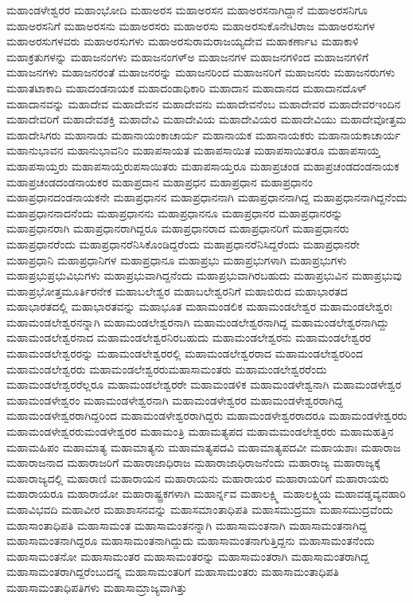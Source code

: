 {ಮಹಾಂಡಳೇಶ್ವರರ
ಮಹಾಂಭೋದಿ
ಮಹಾಅರಸ
ಮಹಾಅರಸನ
ಮಹಾಅರಸನಾಗಿದ್ದಾನೆ
ಮಹಾಅರಸನಿಗೂ
ಮಹಾಅರಸನಿಗೆ
ಮಹಾಅರಸನು
ಮಹಾಅರಸರು
ಮಹಾಅರಸು
ಮಹಾಅರಸುಕೊನೇಟಿರಾಜ
ಮಹಾಅರಸುಗಳ
ಮಹಾಅರಸುಗಳವರು
ಮಹಾಅರಸುಗಳು
ಮಹಾಅರಸುರಾಮರಾಜಯ್ಯದೇವ
ಮಹಾಕರ್ಣಾಟ
ಮಹಾಕಾಳಿ
ಮಹಾಕ್ರತುಗಳನ್ನು
ಮಹಾಜನಂಗಳು
ಮಹಾಜನಂಗಳ್ಅ
ಮಹಾಜನಗಳ
ಮಹಾಜನಗಳಿಂದ
ಮಹಾಜನಗಳಿಗೆ
ಮಹಾಜನಗಳು
ಮಹಾಜನರಂತೆ
ಮಹಾಜನರನ್ನು
ಮಹಾಜನರಿಂದ
ಮಹಾಜನರಿಗೆ
ಮಹಾಜನರು
ಮಹಾಜನರುಗಳು
ಮಹಾತಟಾಕಾದಿ
ಮಹಾದಂಡನಾಯಕ
ಮಹಾದಂಡಾಧಿಕಾರಿ
ಮಹಾದಾನ
ಮಹಾದಾನದ
ಮಹಾದಾನದೊಳ್
ಮಹಾದಾನವನ್ನು
ಮಹಾದೇವ
ಮಹಾದೇವನ
ಮಹಾದೇವನು
ಮಹಾದೇವನೆಂಬ
ಮಹಾದೇವರ
ಮಹಾದೇವರಇಂದಿನ
ಮಹಾದೇವರಿಗೆ
ಮಹಾದೇವಶಕ್ತಿ
ಮಹಾದೇವಿ
ಮಹಾದೇವಿಯ
ಮಹಾದೇವಿಯರ
ಮಹಾದೇವಿಯು
ಮಹಾದೇವೋತ್ತಮ
ಮಹಾದೇಸಿಗರು
ಮಹಾನಾಡು
ಮಹಾನಾಯಂಕಾಚಾರ್ಯ
ಮಹಾನಾಯಕ
ಮಹಾನಾಯಕರು
ಮಹಾನಾಯಕಾಚಾರ್ಯ
ಮಹಾನುಭಾವನ
ಮಹಾನುಭಾವನಿಂ
ಮಹಾಪಸಾಯತ
ಮಹಾಪಸಾಯಿತ
ಮಹಾಪಸಾಯಿತರೂ
ಮಹಾಪಸಾಯ್ತ
ಮಹಾಪಸಾಯ್ತರು
ಮಹಾಪಸಾಯ್ತರುಪಸಾಯಿತರು
ಮಹಾಪಸಾಯ್ತರೂ
ಮಹಾಪ್ರಚಂಡ
ಮಹಾಪ್ರಚಂಡದಂಡನಾಯಕ
ಮಹಾಪ್ರಚಂಡದಂಡನಾಯಕರ
ಮಹಾಪ್ರದಾನ
ಮಹಾಪ್ರಧನ
ಮಹಾಪ್ರಧಾನ
ಮಹಾಪ್ರಧಾನಂ
ಮಹಾಪ್ರಧಾನದಂಡನಾಯಕನೇ
ಮಹಾಪ್ರಧಾನನ
ಮಹಾಪ್ರಧಾನನಾಗಿ
ಮಹಾಪ್ರಧಾನನಾಗಿದ್ದ
ಮಹಾಪ್ರಧಾನನಾಗಿದ್ದನೆಂದು
ಮಹಾಪ್ರಧಾನನಾದನೆಂದು
ಮಹಾಪ್ರಧಾನನು
ಮಹಾಪ್ರಧಾನನೂ
ಮಹಾಪ್ರಧಾನರ
ಮಹಾಪ್ರಧಾನರನ್ನು
ಮಹಾಪ್ರಧಾನರಾಗಿ
ಮಹಾಪ್ರಧಾನರಾಗಿದ್ದರೂ
ಮಹಾಪ್ರಧಾನರಾದ
ಮಹಾಪ್ರಧಾನರಿಗೆ
ಮಹಾಪ್ರಧಾನರು
ಮಹಾಪ್ರಧಾನರೆಂದು
ಮಹಾಪ್ರಧಾನರೆನಿಸಿಕೊಂಡಿದ್ದರೆಂದು
ಮಹಾಪ್ರಧಾನರೆನಿಸಿದ್ದರೆಂದು
ಮಹಾಪ್ರಧಾನರೇ
ಮಹಾಪ್ರಧಾನಿ
ಮಹಾಪ್ರಧಾನಿಗಳ
ಮಹಾಪ್ರಧಾನೂ
ಮಹಾಪ್ರಭು
ಮಹಾಪ್ರಭುಗಳಾಗಿ
ಮಹಾಪ್ರಭುಗಳು
ಮಹಾಪ್ರಭುಪ್ರಭುವಿಭುಗಳು
ಮಹಾಪ್ರಭುವಾಗಿದ್ದನೆಂದು
ಮಹಾಪ್ರಭುವಾಗಿರಬಹುದು
ಮಹಾಪ್ರಭುವಿನ
ಮಹಾಪ್ರಭುವು
ಮಹಾಪ್ರಭೋತ್ತಮೂರ್ತಿರನೇಕ
ಮಹಾಬಲೇಶ್ವರ
ಮಹಾಬಲೇಶ್ವರನಿಗೆ
ಮಹಾಬಿರುದ
ಮಹಾಭಾರತದ
ಮಹಾಭಾರತದಲ್ಲಿ
ಮಹಾಭಾರತವನ್ನು
ಮಹಾಭೂತ
ಮಹಾಮಂಡಲಿಕ
ಮಹಾಮಂಡಲೇಶ್ವರ
ಮಹಾಮಂಡಲೇಶ್ವರಃ
ಮಹಾಮಂಡಲೇಶ್ವರನನ್ನಾಗಿ
ಮಹಾಮಂಡಲೇಶ್ವರನಾಗಿ
ಮಹಾಮಂಡಲೇಶ್ವರನಾಗಿದ್ದ
ಮಹಾಮಂಡಲೇಶ್ವರನಾಗಿದ್ದು
ಮಹಾಮಂಡಲೇಶ್ವರನಾದ
ಮಹಾಮಂಡಲೇಶ್ವರನಿರಬಹುದು
ಮಹಾಮಂಡಲೇಶ್ವರನು
ಮಹಾಮಂಡಲೇಶ್ವರರ
ಮಹಾಮಂಡಲೇಶ್ವರರನ್ನು
ಮಹಾಮಂಡಲೇಶ್ವರರಲ್ಲಿ
ಮಹಾಮಂಡಲೇಶ್ವರರಾದ
ಮಹಾಮಂಡಲೇಶ್ವರರಿಂದ
ಮಹಾಮಂಡಲೇಶ್ವರರು
ಮಹಾಮಂಡಲೇಶ್ವರರುಮಹಾಸಾಮಂತರು
ಮಹಾಮಂಡಲೇಶ್ವರರೆಂದು
ಮಹಾಮಂಡಲೇಶ್ವರರೆಲ್ಲರೂ
ಮಹಾಮಂಡಲೇಶ್ವರರೇ
ಮಹಾಮಂಡಳಿಕ
ಮಹಾಮಂಡಳೇಶ್ವನಾಗಿ
ಮಹಾಮಂಡಳೇಶ್ವರ
ಮಹಾಮಂಡಳೇಶ್ವರಂ
ಮಹಾಮಂಡಳೇಶ್ವರನಾಗಿ
ಮಹಾಮಂಡಳೇಶ್ವರರ
ಮಹಾಮಂಡಳೇಶ್ವರರಾಗಿದ್ದ
ಮಹಾಮಂಡಳೇಶ್ವರರಾಗಿದ್ದರಿಂದ
ಮಹಾಮಂಡಳೇಶ್ವರರಾಗಿದ್ದರು
ಮಹಾಮಂಡಳೇಶ್ವರರಾದರೂ
ಮಹಾಮಂಡಳೇಶ್ವರರು
ಮಹಾಮಂಡಳೇಶ್ವರರುಮಂಡಳೇಶ್ವರರ
ಮಹಾಮಂತ್ರಿ
ಮಹಾಮತ್ಯಪದ
ಮಹಾಮಮಂಡಲೇಶ್ವರರು
ಮಹಾಮಹತ್ತಿನ
ಮಹಾಮಹಿಪಂ
ಮಹಾಮಾತ್ಯ
ಮಹಾಮಾತ್ಯನು
ಮಹಾಮಾತ್ಯಪದವಿ
ಮಹಾಮಾತ್ಯಪದವೀ
ಮಹಾಯಶಾಃ
ಮಹಾರಾಜ
ಮಹಾರಾಜನಾದ
ಮಹಾರಾಜರಿಗೆ
ಮಹಾರಾಜಾಧಿರಾಜ
ಮಹಾರಾಜಾಧಿರಾಜನೆಂದು
ಮಹಾರಾಜ್ಯ
ಮಹಾರಾಜ್ಯಕ್ಕೆ
ಮಹಾರಾಜ್ಯದಲ್ಲಿ
ಮಹಾರಾಣಿ
ಮಹಾರಾಯನ
ಮಹಾರಾಯನು
ಮಹಾರಾಯರ
ಮಹಾರಾಯರಿಗೆ
ಮಹಾರಾಯರು
ಮಹಾರಾಯರೂ
ಮಹಾರಾಯೋ
ಮಹಾರಾಷ್ಟ್ರಕಗಳಾಗಿ
ಮಹಾರ್ನ್ನವ
ಮಹಾಲಕ್ಷ್ಮಿ
ಮಹಾಲಕ್ಷ್ಮಿಯ
ಮಹಾವಡ್ಡವ್ಯವಹಾರಿ
ಮಹಾವಿಭವದಿ
ಮಹಾವೀರ
ಮಹಾಶಾಸನವನ್ನು
ಮಹಾಸಮಾಂತಾಧಿಪತಿ
ಮಹಾಸಮುದ್ರಮಾ
ಮಹಾಸಮುದ್ರವೆಂದು
ಮಹಾಸಾಂತಾಧಿಪತಿ
ಮಹಾಸಾಮಂತ
ಮಹಾಸಾಮಂತನನ್ನಾಗಿ
ಮಹಾಸಾಮಂತನಾಗಿ
ಮಹಾಸಾಮಂತನಾಗಿದ್ದ
ಮಹಾಸಾಮಂತನಾಗಿದ್ದರೂ
ಮಹಾಸಾಮಂತನಾಗಿದ್ದುದು
ಮಹಾಸಾಮಂತನಾಗುತ್ತಿದ್ದನು
ಮಹಾಸಾಮಂತನೆಂದು
ಮಹಾಸಾಮಂತನೋ
ಮಹಾಸಾಮಂತರ
ಮಹಾಸಾಮಂತರನ್ನು
ಮಹಾಸಾಮಂತರಾಗಿ
ಮಹಾಸಾಮಂತರಾಗಿದ್ದ
ಮಹಾಸಾಮಂತರಾಗಿದ್ದರೆಂಬುದನ್ನ
ಮಹಾಸಾಮಂತರಿಗೆ
ಮಹಾಸಾಮಂತರು
ಮಹಾಸಾಮಂತಾಧಿಪತಿ
ಮಹಾಸಾಮಂತಾಧಿಪತಿಗಳು
ಮಹಾಸಾಮ್ರಾಜ್ಯವಾಗಿತ್ತು
}

